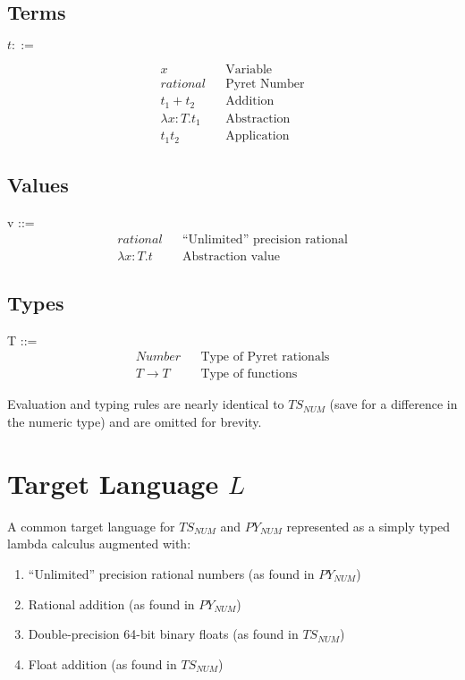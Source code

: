 \documentclass{article}
\begin{document}
	\subsection{Terms}
	$t ::=$
	
	\begin{align*}
	x											&& \text{Variable}\\
	rational  									&& \text{Pyret Number} \\
	t_1 + t_2 									&& \text{Addition} \\
	\lambda x \colon T.t_1						&& \text{Abstraction} \\
	t_1 t_2										&& \text{Application}
	\end{align*}
	
	
	\subsection{Values}
	v ::=
	\begin{align*}
		rational							&& \text{``Unlimited'' precision rational} \\
		\lambda x \colon T.t						&& \text{Abstraction value}
	\end{align*}
	
	
	\subsection{Types}
	T ::=
	\begin{align*}
		Number												&& \text{Type of Pyret rationals}\\
		T \rightarrow T										&& \text{Type of functions}
	\end{align*}
		
	Evaluation and typing rules are nearly identical to $TS_{NUM}$ (save for a difference in the numeric type) and are omitted for brevity.


	\section{Target Language $L$}
	A common target language for $TS_{NUM}$ and $PY_{NUM}$ represented as a simply typed lambda calculus augmented with:
	\begin{enumerate}
		\item ``Unlimited'' precision rational numbers (as found in $PY_{NUM}$)
		\item Rational addition (as found in $PY_{NUM}$)
		\item Double-precision 64-bit binary floats (as found in $TS_{NUM}$)
		\item Float addition (as found in $TS_{NUM}$)
	\end{enumerate}
\end{document}

